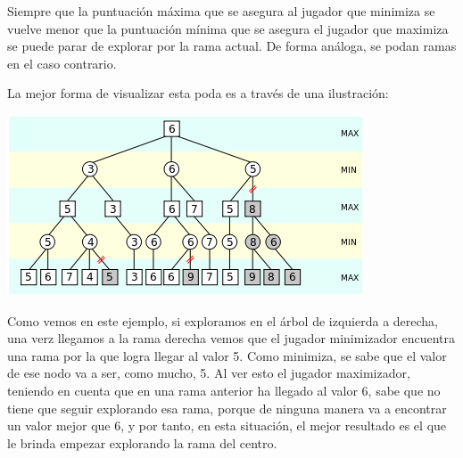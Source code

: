 \documentclass[12pt,a4paper,openright]{book}
\theoremstyle{break}
\begin{document}
Siempre que la puntuación máxima que se asegura al jugador que minimiza se vuelve menor que la puntuación mínima que se asegura el jugador que maximiza se puede parar de explorar por la rama actual. De forma análoga, se podan ramas en el caso contrario.

La mejor forma de visualizar esta poda es a través de una ilustración:

\begin{center}
\centering
\includegraphics[scale=0.5]{poda alfa-beta.png}
\end{center}

Como vemos en este ejemplo, si exploramos en el árbol de izquierda a derecha, una verz llegamos a la rama derecha vemos que el jugador minimizador encuentra una rama por la que logra llegar al valor 5. Como minimiza, se sabe que el valor de ese nodo va a ser, como mucho, 5. Al ver esto el jugador maximizador, teniendo en cuenta que en una rama anterior ha llegado al valor 6, sabe que no tiene que seguir explorando esa rama, porque de ninguna manera va a encontrar un valor mejor que 6, y por tanto, en esta situación, el mejor resultado es el que le brinda empezar explorando la rama del centro.
\end{document}
